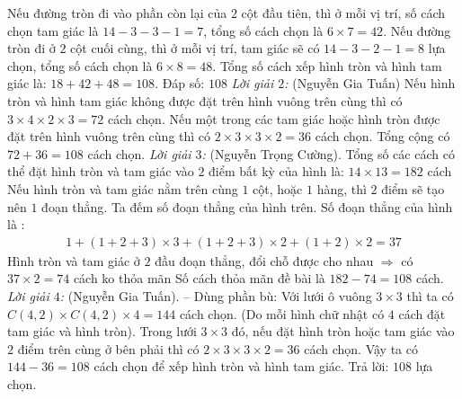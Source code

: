 \vskip 0.1cm
Nếu đường tròn đi vào phần còn lại của $2$ cột đầu tiên, thì ở mỗi vị trí, số cách chọn tam giác là $14 - 3 - 3 - 1 = 7$, tổng số cách chọn là $6 \times 7 = 42$.
\vskip 0.1cm
Nếu đường tròn đi ở $2$ cột cuối cùng, thì ở mỗi vị trí, tam giác sẽ có $14 - 3 - 2 - 1 = 8$ lựa chọn, tổng số cách chọn là $6 \times 8 = 48$.
\vskip 0.1cm
Tổng số cách xếp hình tròn và hình tam giác là: $18 + 42 + 48 = 108$.
\vskip 0.1cm
Đáp số: $108$
\vskip 0.1cm
\textit{Lời giải $2$:} (Nguyễn Gia Tuấn)
\vskip 0.1cm
Nếu hình tròn và hình tam giác không được đặt trên hình vuông trên cùng thì có $3 \times 4 \times 2 \times 3 = 72$ cách chọn.
\vskip 0.1cm
Nếu một trong các tam giác hoặc hình tròn được đặt trên hình vuông trên cùng thì có $2 \times 3 \times 3 \times 2 = 36$ cách chọn.
\vskip 0.1cm
Tổng cộng có $72 + 36 = 108$ cách chọn.
\vskip 0.1cm
\textit{Lời giải $3$:} (Nguyễn Trọng Cường).
\vskip 0.1cm
Tổng số các cách có thể đặt hình tròn và tam giác vào $2$ điểm bất kỳ của hình là: $14\times13 = 182$ cách
\vskip 0.1cm
Nếu hình tròn và tam giác nằm trên cùng $1$ cột, hoặc $1$ hàng, thì $2$ điểm sẽ tạo nên $1$ đoạn thẳng. Ta đếm số đoạn thẳng của hình trên.
\vskip 0.1cm
Số đoạn thẳng của hình là :
\begin{align*}
	1 + (1+2+3) \times 3 + (1+2+3) \times 2 + (1+2) \times 2 = 37
\end{align*}
Hình tròn và tam giác ở $2$ đầu đoạn thẳng, đổi chỗ được cho nhau $\Rightarrow$ có $37 \times 2 = 74$ cách ko thỏa mãn
\vskip 0.1cm
Số cách thỏa mãn đề bài là $182 - 74 = 108$ cách.
\vskip 0.1cm
\textit{Lời giải $4$:} (Nguyễn Gia Tuấn). -- Dùng phần bù:
\vskip 0.1cm
Với lưới ô vuông $3 \times 3$ thì ta có $C(4,2)\times C(4,2)\times 4 = 144$ cách chọn. (Do mỗi hình chữ nhật có $4$ cách đặt tam giác và hình tròn).
\vskip 0.1cm
Trong lưới $3 \times 3$ đó, nếu đặt hình tròn hoặc tam giác vào $2$ điểm trên cùng ở bên phải thì có $2 \times 3 \times  3 \times 2 = 36$ cách chọn.
\vskip 0.1cm
Vậy ta có $144 - 36 = 108$ cách chọn để xếp hình tròn và hình tam giác.
\vskip 0.1cm
Trả lời: $108$ lựa chọn.